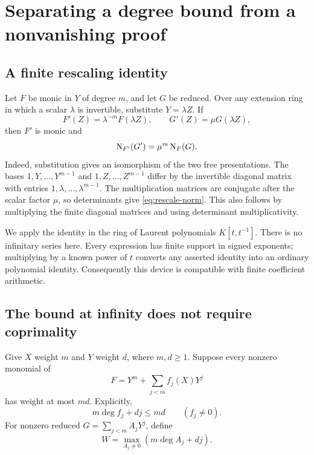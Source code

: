 \section{Separating a degree bound from a nonvanishing proof}
\label{sec:local}

\subsection{A finite rescaling identity}

Let $F$ be monic in $Y$ of degree $m$, and let $G$ be reduced. Over any extension ring in which a scalar $\lambda$ is invertible, substitute $Y=\lambda Z$. If
\[
 F'(Z)=\lambda^{-m}F(\lambda Z),\qquad
 G'(Z)=\mu G(\lambda Z),
\]
then $F'$ is monic and
\begin{equation}\label{eq:rescale-norm}
 \operatorname{N}_{F'}(G')=\mu^m\operatorname{N}_F(G).
\end{equation}
Indeed, substitution gives an isomorphism of the two free presentations. The bases $1,Y,\ldots,Y^{m-1}$ and $1,Z,\ldots,Z^{m-1}$ differ by the invertible diagonal matrix with entries $1,\lambda,\ldots,\lambda^{m-1}$. The multiplication matrices are conjugate after the scalar factor $\mu$, so determinants give \eqref{eq:rescale-norm}. This also follows by multiplying the finite diagonal matrices and using determinant multiplicativity.

We apply the identity in the ring of Laurent polynomials $K[t,t^{-1}]$. There is no infinitary series here. Every expression has finite support in signed exponents; multiplying by a known power of $t$ converts any asserted identity into an ordinary polynomial identity. Consequently this device is compatible with finite coefficient arithmetic.

\subsection{The bound at infinity does not require coprimality}

Give $X$ weight $m$ and $Y$ weight $d$, where $m,d\ge1$. Suppose every nonzero monomial of
\[
 F=Y^m+\sum_{j<m}f_j(X)Y^j
\]
has weight at most $md$. Explicitly,
\begin{equation}\label{eq:global-guard}
 m\deg f_j+dj\le md\qquad(f_j\ne0).
\end{equation}
For nonzero reduced $G=\sum_{j<m}A_jY^j$, define
\[
 W=\max_{A_j\ne0}(m\deg A_j+dj).
\]

